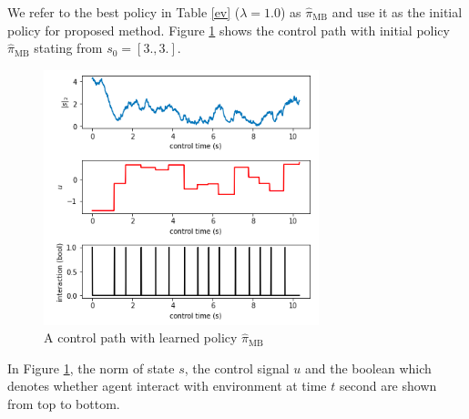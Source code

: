 \documentclass[english, dvipdfmx]{ampmt}             %
\begin{document}
We refer to the best policy in Table \ref{ev} ($\lambda = 1.0$) as $\hat{\pi}_{\textrm{MB}}$ and use it as the initial policy for proposed method. Figure \ref{naiive} shows the control path with initial policy $\hat{\pi}_{\textrm{MB}}$ stating from $s_0 = [3., 3.]$.
\begin{figure}[H]
	\centering
 	\includegraphics[width=8cm]{naiive.png}
 	\caption{A control path with learned policy $\hat{\pi}_{\textrm{MB}}$} \label{naiive}
\end{figure}
In Figure \ref{naiive}, the norm of state $s$, the control signal $u$ and the boolean which denotes whether agent interact with environment at time $t$ second are shown from top to bottom.
\end{document}
